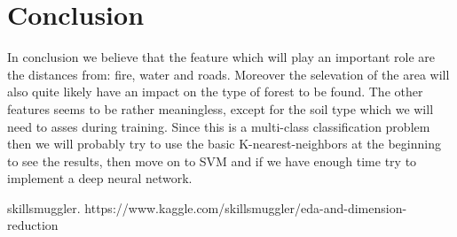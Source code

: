 \documentclass[a4paper, 11pt]{article}
\begin{document}
\section*{Conclusion}
In conclusion we believe that the feature which will play an important role are the distances from: fire, water and roads. Moreover the selevation of the area will also quite likely have an impact on the type of forest to be found. The other features seems to be rather meaningless, except for the soil type which we will need to asses during training. Since this is a multi-class classification problem then we will probably try to use the basic K-nearest-neighbors at the beginning to see the results, then move on to SVM and if we have enough time try to implement a deep neural network.

\begin{thebibliography}{9}
 skillsmuggler. https://www.kaggle.com/skillsmuggler/eda-and-dimension-reduction
\end{thebibliography}
\end{document}
